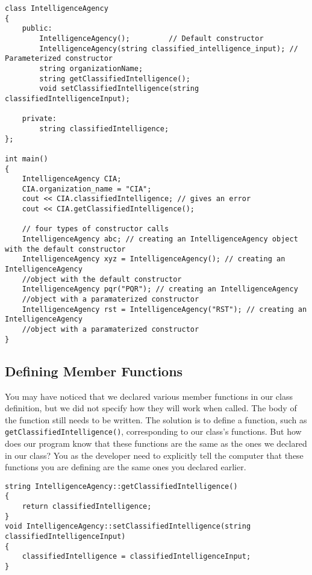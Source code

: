 \begin{verbatim}
class IntelligenceAgency
{
    public:
        IntelligenceAgency();         // Default constructor
        IntelligenceAgency(string classified_intelligence_input); // Parameterized constructor  
        string organizationName;
        string getClassifiedIntelligence();
        void setClassifiedIntelligence(string classifiedIntelligenceInput);

    private:
        string classifiedIntelligence;
};

int main()
{
    IntelligenceAgency CIA;
    CIA.organization_name = "CIA";
    cout << CIA.classifiedIntelligence; // gives an error
    cout << CIA.getClassifiedIntelligence();
    
    // four types of constructor calls
    IntelligenceAgency abc; // creating an IntelligenceAgency object with the default constructor 
    IntelligenceAgency xyz = IntelligenceAgency(); // creating an IntelligenceAgency 
    //object with the default constructor 
    IntelligenceAgency pqr("PQR"); // creating an IntelligenceAgency 
    //object with a paramaterized constructor
    IntelligenceAgency rst = IntelligenceAgency("RST"); // creating an IntelligenceAgency 
    //object with a paramaterized constructor
}
\end{verbatim}

\subsection{Defining Member Functions}
You may have noticed that we declared various member functions in our class definition, but we did not specify how they will work when called. The body of the function still needs to be written. The solution is to define a function, such as \texttt{getClassifiedIntelligence()}, corresponding to our class’s functions. But how does our program know that these functions are the same as the ones we declared in our class? You as the developer need to explicitly tell the computer that these functions you are defining are the same ones you declared earlier.

\begin{verbatim}
string IntelligenceAgency::getClassifiedIntelligence()
{
    return classifiedIntelligence;
}
void IntelligenceAgency::setClassifiedIntelligence(string classifiedIntelligenceInput)
{
    classifiedIntelligence = classifiedIntelligenceInput;
}
\end{verbatim}

